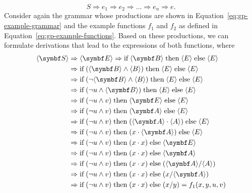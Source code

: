 \begin{equation*}
	S \Rightarrow e_1 \Rightarrow e_2 \Rightarrow \dots \Rightarrow e_n \Rightarrow e.
\end{equation*}
Consider again the grammar whose productions are shown in Equation~\eqref{eq:gp-example-grammar} and the example functions $f_1$ and $f_2$ as defined in Equation~\eqref{eq:gp-example-functions}.
Based on these productions, we can formulate derivations that lead to the expressions of both functions, where
\begin{equation}
	\begin{aligned}
		\bps{S} & \Rightarrow \bps{E} \Rightarrow \text{if} \; \bps B \; \text{then} \; \ps E \; \text{else} \; \ps E 
		\\ & \Rightarrow \text{if} \; (\bps B \wedge \ps B) \; \text{then} \; \ps E \; \text{else} \; \ps E
		\\ & \Rightarrow \text{if} \; (\neg \bps B \wedge \ps B) \; \text{then} \; \ps E \; \text{else} \; \ps E 
		\\ & \Rightarrow \text{if} \; (\neg u \wedge \bps B) \; \text{then} \; \ps E \; \text{else} \; \ps E 
		\\ & \Rightarrow \text{if} \; (\neg u \wedge v) \; \text{then} \; \bps E \; \text{else} \; \ps E 	
		\\ & \Rightarrow \text{if} \; (\neg u \wedge v) \; \text{then} \; \bps A \; \text{else} \; \ps E 	
		\\ & \Rightarrow \text{if} \; (\neg u \wedge v) \; \text{then} \; (\bps A \cdot \ps A) \; \text{else} \; \ps E 	 
		\\ & \Rightarrow \text{if} \; (\neg u \wedge v) \; \text{then} \; (x \cdot \bps A) \; \text{else} \; \ps E 
		\\ & \Rightarrow \text{if} \; (\neg u \wedge v) \; \text{then} \; (x \cdot x) \; \text{else} \; \bps E
		\\ & \Rightarrow \text{if} \; (\neg u \wedge v) \; \text{then} \; (x \cdot x) \; \text{else} \; \bps A
		\\ & \Rightarrow \text{if} \; (\neg u \wedge v) \; \text{then} \; (x \cdot x) \; \text{else} \; (\bps A / \ps A)
		\\ & \Rightarrow \text{if} \; (\neg u \wedge v) \; \text{then} \; (x \cdot x) \; \text{else} \; (x / \bps A)
		\\ & \Rightarrow \text{if} \; (\neg u \wedge v) \; \text{then} \; (x \cdot x) \; \text{else} \; (x / y) = f_1(x,y,u,v)
	\end{aligned}
\label{eq:gp-derivation-f1}
\end{equation}
